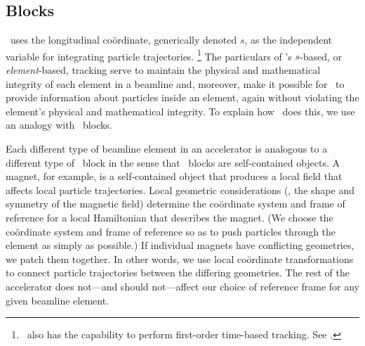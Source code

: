 \subsection{Blocks}
\label{sec:blocks}

%
\PTC\ uses the longitudinal co\"ordinate, generically denoted $s$,
as the independent variable for integrating particle trajectories.%
\footnote{\PTC\ also has the capability to perform first-order
time-based tracking. See .}
The particulars of \PTC's $s$-based, or \emph{element}-based, tracking
serve to maintain the physical and mathematical integrity of each
element in a beamline and, moreover, make it possible for \PTC\ to
provide information about particles inside an element, again without
violating the element's physical and mathematical integrity.
To explain how \PTC\ does this, we use an analogy with \LEGOr\ blocks.

%
Each different type of beamline element in an accelerator is analogous
to a different type of \LEGO\ block in the sense that \LEGO\ blocks are
self-contained objects. A magnet, for example, is a self-contained object
that produces a local field that affects local particle trajectories.
Local geometric considerations (\eg, the shape and symmetry of the
magnetic field) determine the co\"ordinate system and frame of reference
for a local Hamiltonian that describes the magnet.  (We choose the
co\"ordinate system and frame of reference so as to push particles
through the element as simply as possible.)
If individual magnets have conflicting geometries, we patch them together.
In other words, we use local co\"ordinate transformations to connect
particle trajectories between the differing geometries. The rest
of the accelerator does not---and should not---affect our choice of
reference frame for any given beamline element.

